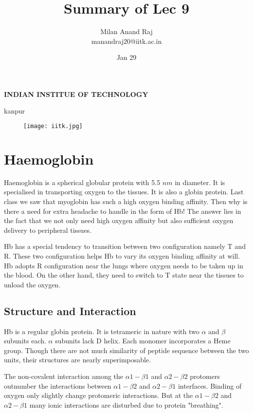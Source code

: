 \documentclass[12pt]{article}
\title{Summary of Lec 9}
\author{Milan Anand Raj\\manandraj20@iitk.ac.in}
\date{Jan 29}
\begin{document}
\NoBgThispage
\maketitle



\begin{center}
\textbf{INDIAN INSTITUE OF TECHNOLOGY}

kanpur
\end{center}


\vfill
\begin{figure}
\centering
\texttt{[image: iitk.jpg]}
\end{figure}
\clearpage
\tableofcontents
\clearpage
\NoBgThispage
\section{Haemoglobin}
Haemoglobin is a spherical globular protein with 5.5 $nm$ in diameter. It is specialised in transporting oxygen to the tissues. It is also a globin protein. Last class we saw that myoglobin has such a high oxygen binding affinity. Then why is there a need for extra headache to handle in the form of Hb! The answer lies in the fact that we not only need high oxygen affinity but also sufficient oxygen delivery to peripheral tissues.

Hb has a special tendency to transition between two configuration namely T and R. These two configuration helps Hb to vary its oxygen binding affinity at will. Hb adopts R configuration near the lungs where oxygen needs to be taken up in the blood. On the other hand, they need to switch to T state near the tissues to unload the oxygen.

 

\subsection{Structure and Interaction }
Hb is a regular globin protein. It is tetrameric in nature with two $\alpha$ and $\beta$ subunits each. $\alpha$ subunits lack D helix. Each monomer incorporates a Heme group. Though there are not much similarity of peptide sequence between the two units, their structures are nearly superimposable.

The non-covalent interaction among the $\alpha1-\beta1$ and $\alpha2-\beta2$ protomers outnumber the interactions between $\alpha1-\beta2$ and $\alpha2-\beta1$ interfaces. Binding of oxygen only slightly change protomeric interactions. But at the $\alpha1-\beta2$ and $\alpha2-\beta1$ many ionic interactions are disturbed due to protein "breathing".
\end{document}
